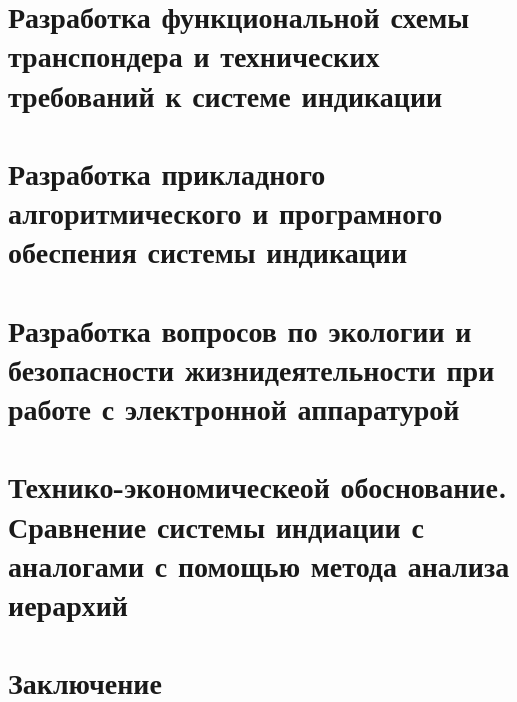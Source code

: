 \documentclass[a4paper,12pt]{report} %
\begin{document}
\section{Разработка функциональной схемы транспондера и технических требований к
  системе индикации} %
\lipsum [6]
\section{Разработка прикладного алгоритмического и
 програмного обеспения  системы индикации} %
\lipsum [7]
\section{Разработка вопросов по экологии и безопасности жизнидеятельности при
  работе с электронной аппаратурой} %
\lipsum [1]
\section{Технико-экономическеой обоснование. Сравнение системы индиации с
  аналогами с помощью метода анализа иерархий} %
\lipsum [1]
\section{Заключение}
\end{document}
